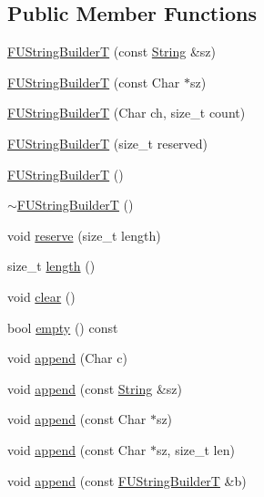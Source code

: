 \subsection*{Public Member Functions}
\begin{DoxyCompactItemize}
\item 
\hyperlink{classFUStringBuilderT_a91f7ece52aa74e753f4b6062fa5e8b86}{FUStringBuilderT} (const \hyperlink{classfm_1_1stringT}{String} \&sz)
\item 
\hyperlink{classFUStringBuilderT_afa5973392532db8eeb34bb3a3e7d05b7}{FUStringBuilderT} (const Char $\ast$sz)
\item 
\hyperlink{classFUStringBuilderT_abe37ba1c75915d13b45acd8da4e7f635}{FUStringBuilderT} (Char ch, size\_\-t count)
\item 
\hyperlink{classFUStringBuilderT_a5e9d1bc5be1082bf90a938162ad6a884}{FUStringBuilderT} (size\_\-t reserved)
\item 
\hyperlink{classFUStringBuilderT_a00171f846b560f6aeb8dfdeba64f8a80}{FUStringBuilderT} ()
\item 
\hyperlink{classFUStringBuilderT_a361e0a5d63664f81da9b05398744d6fc}{$\sim$FUStringBuilderT} ()
\item 
void \hyperlink{classFUStringBuilderT_a7b5318f7e8d9141c872d598486cca38a}{reserve} (size\_\-t length)
\item 
size\_\-t \hyperlink{classFUStringBuilderT_a5355e1bb17d7a1289fda368791f9bc65}{length} ()
\item 
void \hyperlink{classFUStringBuilderT_ac96aef7b03a2422724cec6dc25045685}{clear} ()
\item 
bool \hyperlink{classFUStringBuilderT_af5b84ae04c1472ef5a83a6dfc4743622}{empty} () const 
\item 
void \hyperlink{classFUStringBuilderT_af33b4c42583e46843d6a59bdc223d256}{append} (Char c)
\item 
void \hyperlink{classFUStringBuilderT_a4cd340250d45997ba2647b06073a09cd}{append} (const \hyperlink{classfm_1_1stringT}{String} \&sz)
\item 
void \hyperlink{classFUStringBuilderT_a93fa36e1388dbb2947195f93dcf5fe6d}{append} (const Char $\ast$sz)
\item 
void \hyperlink{classFUStringBuilderT_a312b24a1809d3837304c3db9993454a3}{append} (const Char $\ast$sz, size\_\-t len)
\item 
void \hyperlink{classFUStringBuilderT_a4b79b3acdf1974ba46b53f158b3241d8}{append} (const \hyperlink{classFUStringBuilderT}{FUStringBuilderT} \&b)
\item 

\end{DoxyCompactItemize}
